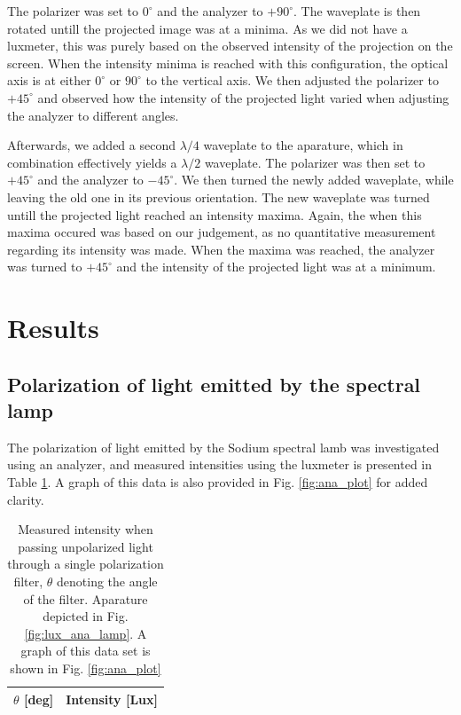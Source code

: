 \documentclass[%
 reprint,
 amsmath,amssymb,
 aps,
]{revtex4-1}
\begin{document}
    The polarizer was set to $0^\circ$ and the analyzer to $+90^\circ$. The waveplate is then rotated untill the projected image was at a minima. As we did not have a luxmeter, this was purely based on the observed intensity of the projection on the screen. When the intensity minima is reached with this configuration, the optical axis is at either $0^\circ$ or $90^\circ$ to the vertical axis. We then adjusted the polarizer to $+45^\circ$ and observed how the intensity of the projected light varied when adjusting the analyzer to different angles.

    Afterwards, we added a second $\lambda/4$ waveplate to the aparature, which in combination effectively yields a $\lambda/2$ waveplate. The polarizer was then set to $+45^\circ$ and the analyzer to $-45^\circ$. We then turned the newly added waveplate, while leaving the old one in its previous orientation. The new waveplate was turned untill the projected light reached an intensity maxima. Again, the when this maxima occured was based on our judgement, as no quantitative measurement regarding its intensity was made. When the maxima was reached, the analyzer was turned to $+45^\circ$ and the intensity of the projected light was at a minimum.
    


\section{\label{sect:results}Results}
  
  \subsection{Polarization of light emitted by the spectral lamp}

  The polarization of light emitted by the Sodium spectral lamb was investigated using an analyzer, and measured intensities using the luxmeter is presented in Table \ref{tab:ana}. A graph of this data is also provided in Fig. \ref{fig:ana_plot} for added clarity.

  \begin{table}[h!]
      \center
      \caption{Measured intensity when passing unpolarized light through a single polarization filter, $\theta$ denoting the angle of the filter. Aparature depicted in Fig. \ref{fig:lux_ana_lamp}. A graph of this data set is shown in Fig. \ref{fig:ana_plot}}
       \begin{tabular}{r | l}
        $\theta$ [deg] & Intensity [Lux] \\ \hline
         
       \end{tabular}
       \label{tab:ana}
  \end{table}
\end{document}
